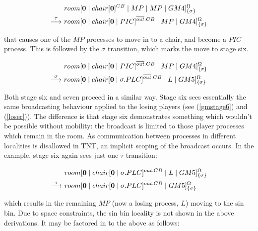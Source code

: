 \begin{equation}
\begin{aligned}
& {room}[ \textbf{0} \;|\; {chair}[ \textbf{0} ]^{CB} \;|\; 
   MP \;|\; MP \;|\;
   GM4 ]^{\Omega}_{\{\sigma\}} \\
\stackrel{\tau}{\longrightarrow}\ & {room}[ \textbf{0} \;|\; {chair}[ \textbf{0} \;|\; PIC ]^{\overline{out}.CB} \;|\; 
   MP \;|\;
   GM4 ]^{\Omega}_{\{\sigma\}} \\
\end{aligned}
\end{equation}

\noindent that causes one of the $MP$ processes to move in to a
chair, and become a $PIC$ process.  This is followed by the
$\sigma$ transition, which marks the move to stage six.

\begin{equation}
\begin{aligned}
&  {room}[ \textbf{0} \;|\; {chair}[ \textbf{0} \;|\; PIC ]^{\overline{out}.CB} \;|\; 
   MP \;|\;
   GM4 ]^{\Omega}_{\{\sigma\}} \\
\stackrel{\sigma}{\longrightarrow}\ & {room}[ \textbf{0} \;|\; {chair}[ \textbf{0} \;|\; \sigma.PLC ]^{\overline{out}.CB} \;|\; 
   L \;|\;
   GM5 ]^{\Omega}_{\{\sigma\}} \\
\end{aligned}
\end{equation}

Both stage six and seven proceed in a similar way.  Stage six sees
essentially the same broadcasting behaviour applied to the losing
players (see (\ref{gmstage6}) and (\ref{loser})).  The difference is
that stage six demonstrates something which wouldn't be possible without
mobility: the broadcast is limited to those player processes which
remain in the room.  As communication between processes in different
localities is disallowed in TNT, an implicit scoping of the broadcast
occurs.  In the example, stage six again sees just one $\tau$
transition:

\begin{equation}
\begin{aligned}
&  {room}[ \textbf{0} \;|\; {chair}[ \textbf{0} \;|\; \sigma.PLC ]^{\overline{out}.CB} \;|\; 
   L \;|\;
   GM5 ]^{\Omega}_{\{\sigma\}} \\
\stackrel{\tau}{\longrightarrow}\ & {room}[ \textbf{0} \;|\; {chair}[ \textbf{0} \;|\; \sigma.PLC ]^{\overline{out}.CB} \;|\;
   GM5 ]^{\Omega}_{\{\sigma\}} \\
\end{aligned}
\end{equation}

\noindent which results in the remaining $MP$ (now a losing
process, $L$) moving to the sin bin.  Due to space constraints, the sin bin
locality is not shown in the above derivations.  It may be factored in
to the above as follows:


